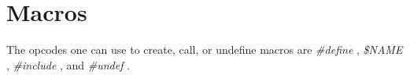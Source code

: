 \begin{comment}
\documentclass[10pt]{article}
\usepackage{fullpage, graphicx, url}
\setlength{\parskip}{1ex}
\setlength{\parindent}{0ex}
\title{Macros}



\begin{tabular}{ccc}
The Alternative Csound Reference Manual & & \\
Previous &Instrument Control &Next

\end{tabular}

\end{comment}
\section{Macros}


  The opcodes one can use to create, call, or undefine macros are \emph{\#define}
, \emph{\$NAME}
, \emph{\#include}
, and \emph{\#undef}
. 


\begin{comment}
\begin{tabular}{lcr}
Previous &Home &Next \\
Instrument Invocation &Up &Program Flow Control

\end{tabular}



\end{comment}
